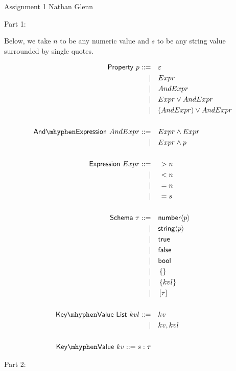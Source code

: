 \documentclass[11pt]{article}
\newcommand{\jarr}[1]{\left[#1\right]}   %
\newcommand{\jobj}[1]{\left\{#1\right\}} %
\newcommand{\pgt}[1]{\, > {#1}}          %
\newcommand{\plt}[1]{\, < {#1}}          %
\newcommand{\peq}[1]{\, = {#1}}          %
\newcommand{\prop}[1]{\langle{#1}\rangle}%
\begin{document}
\hwtitle
  {Assignment 1}
  {Nathan Glenn}


Part 1:

Below, we take $n$ to be any numeric value and $s$ to be any string value surrounded by single quotes.

\begin{alignat*}{1}
\msf{Property}~p ::= \qamp \varepsilon \\
\mid \qamp Expr \\
\mid \qamp AndExpr \\
\mid \qamp Expr \lor AndExpr \\
\mid \qamp (AndExpr) \lor AndExpr \\
\\
\msf{And{\mhyphen}Expression}~AndExpr ::= \qamp Expr \land Expr \\
\mid \qamp Expr \land p \\
\\
\msf{Expression}~Expr ::= \qamp \pgt{n} \\
\mid \qamp \plt{n} \\
\mid \qamp \peq{n} \\
\mid \qamp \peq{s} \\
\\
\msf{Schema}~\tau ::= \qamp \tnum \prop{p} \\
\mid \qamp \tstr \prop{p} \\
\mid \qamp \truet \\
\mid \qamp \falset \\
\mid \qamp \tbool \\
\mid \qamp \jobj{} \\
\mid \qamp \jobj{kvl} \\
\mid \qamp \jarr{\tau} \\
\\
\msf{Key{\mhyphen}Value\ List}~kvl ::= \qamp kv \\
\mid \qamp kv , kvl \\
\\
\msf{Key{\mhyphen}Value}~kv ::= s : \tau
\end{alignat*}

Part 2:
\end{document}
